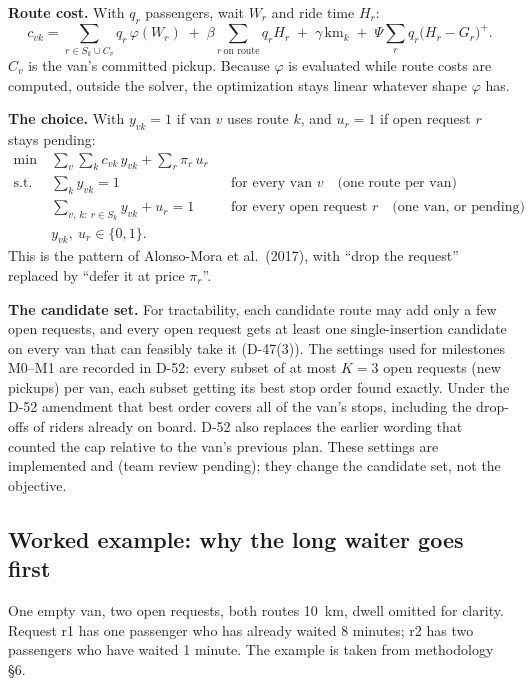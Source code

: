 \documentclass[11pt,letterpaper]{article}
\newcommand{\status}[2]{{\setlength{\fboxsep}{1.1pt}\fcolorbox{#1}{white}{\textcolor{#1}{\sffamily\scriptsize\strut #2}}}}
\newcommand{\Provisional}{\status{cProvisional}{provisional}}
\newcommand{\D}[1]{D-#1}
\begin{document}
\textbf{Route cost.} With $q_r$ passengers, wait $W_r$ and ride time $H_r$:
\begin{equation}
c_{vk} = \sum_{r \in S_k \cup C_v} q_r\, \varphi(W_r) \;+\; \beta \sum_{r\ \text{on route}} q_r H_r \;+\; \gamma\, \text{km}_k \;+\; \Psi \sum_{r} q_r \bigl(H_r - G_r\bigr)^{+} .
\end{equation}
$C_v$ is the van's committed pickup. Because $\varphi$ is evaluated while route costs are computed, outside the solver, the optimization stays linear whatever shape $\varphi$ has.

\textbf{The choice.} With $y_{vk} = 1$ if van $v$ uses route $k$, and $u_r = 1$ if open request $r$ stays pending:
\begin{equation}
\begin{aligned}
\min\ & \sum_{v}\sum_{k} c_{vk}\, y_{vk} + \sum_{r} \pi_r\, u_r\\
\text{s.t. } & \textstyle\sum_{k} y_{vk} = 1 && \text{for every van } v \quad\text{(one route per van)}\\
& \textstyle\sum_{v,\,k:\ r \in S_k} y_{vk} + u_r = 1 && \text{for every open request } r \quad\text{(one van, or pending)}\\
& y_{vk},\ u_r \in \{0, 1\}.
\end{aligned}
\end{equation}
This is the pattern of Alonso-Mora et al.\ (2017), with ``drop the request'' replaced by ``defer it at price $\pi_r$''.

\textbf{The candidate set.} For tractability, each candidate route may add only a few open requests, and every open request gets at least one single-insertion candidate on every van that can feasibly take it (\D{47}(3)). The settings used for milestones M0--M1 are recorded in \D{52}: every subset of at most $K = 3$ open requests (new pickups) per van, each subset getting its best stop order found exactly. Under the \D{52} amendment that best order covers all of the van's stops, including the drop-offs of riders already on board. \D{52} also replaces the earlier wording that counted the cap relative to the van's previous plan. These settings are implemented and \Provisional{} (team review pending); they change the candidate set, not the objective.

\subsection{Worked example: why the long waiter goes first}
One empty van, two open requests, both routes 10~km, dwell omitted for clarity. Request r1 has one passenger who has already waited 8 minutes; r2 has two passengers who have waited 1 minute. The example is taken from methodology §6.
\end{document}
